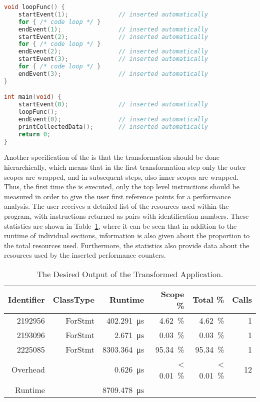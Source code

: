 \begin{lstlisting}[float, language=C++, caption={[Code Showing the Instructions Wrapped by Performance Counters.]Example Code Showing the Instructions Wrapped by Performance Counters.}, label=lst:intro:Inserted Performance Counter]
void loopFunc() {
    startEvent(1);              // inserted automatically
    for { /* code loop */ }
    endEvent(1);                // inserted automatically
    startEvent(2);              // inserted automatically
    for { /* code loop */ }
    endEvent(2);                // inserted automatically
    startEvent(3);              // inserted automatically
    for { /* code loop */ }
    endEvent(3);                // inserted automatically
}

int main(void) {
    startEvent(0);              // inserted automatically
    loopFunc();
    endEvent(0);                // inserted automatically
    printCollectedData();       // inserted automatically
    return 0;
}
\end{lstlisting}

Another specification of the \TOOL is that the transformation should be done hierarchically, which means that in the first transformation step only the outer scopes are wrapped, and in subsequent steps, also inner scopes are wrapped. Thus, the first time the \TOOL is executed, only the top level instructions should be measured in order to give the user first reference points for a performance analysis. The user receives a detailed list of the resources used within the program, with instructions returned as pairs with identification numbers. These statistics are shown in Table~\ref{tab:i:example_output_tool}, where it can be seen that in addition to the runtime of individual sections, information is also given about the proportion to the total resources used. Furthermore, the statistics also provide data about the resources used by the inserted performance counters. 

\begin{table}
  \centering
  \caption{The Desired Output of the Transformed Application.}
  \begin{tabular}{rrrrrr}
    \toprule
    Identifier & ClassType & Runtime                      & Scope \%              & Total \%              & Calls \\
    \midrule
    2192956    & ForStmt   & \SI{402.291}{\micro\second}  & \SI{4.62}{\percent}   & \SI{4.62}{\percent}   & 1     \\
    2193096    & ForStmt   & \SI{2.671}{\micro\second}    & \SI{0.03}{\percent}   & \SI{0.03}{\percent}   & 1     \\
    2225085    & ForStmt   & \SI{8303.364}{\micro\second} & \SI{95.34}{\percent}  & \SI{95.34}{\percent}  & 1     \\
    Overhead   &           & \SI{0.626}{\micro\second}    & < \SI{0.01}{\percent} & < \SI{0.01}{\percent} & 12    \\
    \midrule
    Runtime    &           & \SI{8709.478}{\micro\second} &                       &                       &       \\
    \bottomrule
  \end{tabular}
  \label{tab:i:example_output_tool}
\end{table}

